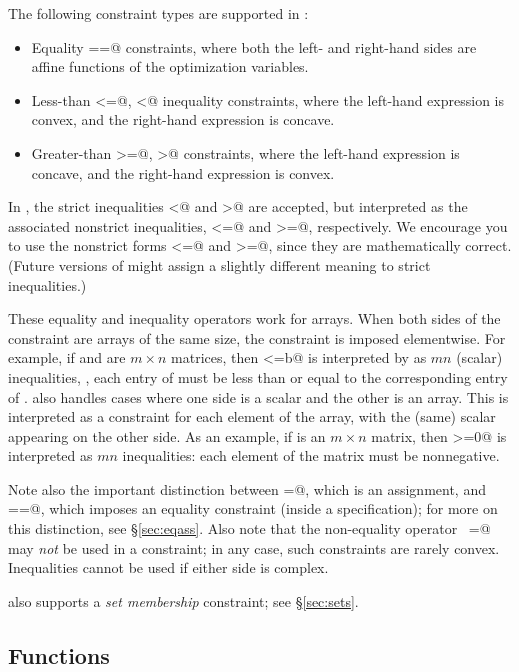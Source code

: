 \documentclass[12pt]{article}
\begin{document}
The following constraint types are supported in \cvx:
\begin{itemize}
\item Equality \verb@==@ constraints, where both the left- and right-hand
sides are affine functions of the optimization variables.
\item Less-than \verb@<=@, \verb@<@ inequality constraints, where the left-hand
expression is convex, and the right-hand expression is concave.
\item Greater-than \verb@>=@, \verb@>@ constraints, where the left-hand
expression is concave, and the right-hand expression is convex.
\end{itemize}
In \cvx, the strict inequalities \verb@<@ and \verb@>@ are accepted,
but interpreted as the associated nonstrict inequalities, \verb@<=@
and \verb@>=@, respectively.   We encourage you to
use the nonstrict forms \verb@<=@ and \verb@>=@, since they are
mathematically correct.
(Future versions of \cvx might assign a slightly different meaning
to strict inequalities.)

These equality and inequality operators work for arrays.
When both sides of the constraint are arrays of the same size,
the constraint is imposed elementwise. For example, if \verb@a@ and \verb@b@
are $m \times n$ matrices, then \verb@a<=b@
is interpreted by \cvx as $mn$ (scalar) inequalities, \ie,
each entry of \verb@a@ must be less than or equal to
the corresponding entry of \verb@b@.
\cvx also handles cases where one side is 
a scalar and the other is an array.  This is interpreted as a
constraint for each element of the array, with the (same) scalar
appearing on the other side.
As an example, if \verb@a@ is an $m\times n$ matrix, then \verb@a>=0@ 
is interpreted as $mn$ inequalities: each element of the matrix
must be nonnegative.

Note also the important distinction between \verb@=@, which is an 
assignment, and \verb@==@, which imposes an equality constraint
(inside a \cvx specification); for more on this distinction,
see \S\ref{sec:eqass}.
Also note that the non-equality operator \verb@~=@ may \emph{not}
be used in a constraint; in any case, such constraints are 
rarely convex.
Inequalities cannot be used if either side is complex.

\cvx also supports a \emph{set membership} constraint; 
see \S\ref{sec:sets}.

\subsection{Functions}
\end{document}

